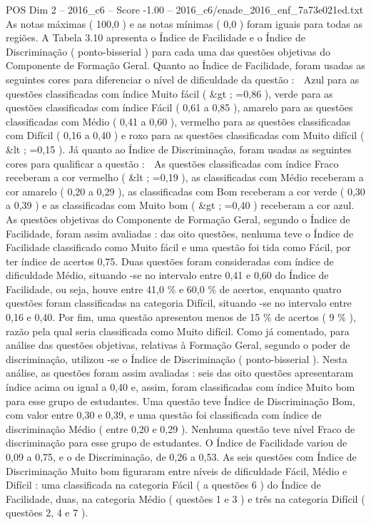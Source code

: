 \begin{textsample}{POS Dim 2 – 2016\_c6 – Score -1.00 – 2016\_c6/enade\_2016\_enf\_7a73e021ed.txt}
As notas máximas ( 100,0 ) e as notas mínimas ( 0,0 ) foram iguais para todas as regiões.
A Tabela 3.10 apresenta o Índice de Facilidade e o Índice de Discriminação ( ponto-bisserial ) para cada uma das questões objetivas do Componente de Formação Geral.
Quanto ao Índice de Facilidade, foram usadas as seguintes cores para diferenciar o nível de dificuldade da questão :  Azul para as questões classificadas com índice Muito fácil ( \&gt ; =0,86 ), verde para as questões classificadas com índice Fácil ( 0,61 a 0,85 ), amarelo para as questões classificadas com Médio ( 0,41 a 0,60 ), vermelho para as questões classificadas com Difícil ( 0,16 a 0,40 ) e roxo para as questões classificadas com Muito difícil ( \&lt ; =0,15 ).
Já quanto ao Índice de Discriminação, foram usadas as seguintes cores para qualificar a questão :  As questões classificadas com índice Fraco receberam a cor vermelho ( \&lt ; =0,19 ), as classificadas com Médio receberam a cor amarelo ( 0,20 a 0,29 ), as classificadas com Bom receberam a cor verde ( 0,30 a 0,39 ) e as classificadas com Muito bom ( \&gt ; =0,40 ) receberam a cor azul.
As questões objetivas do Componente de Formação Geral, segundo o Índice de Facilidade, foram assim avaliadas : das oito questões, nenhuma teve o Índice de Facilidade classificado como Muito fácil e uma questão foi tida como Fácil, por ter índice de acertos 0,75.
Duas questões foram consideradas com índice de dificuldade Médio, situando -se no intervalo entre 0,41 e 0,60 do Índice de Facilidade, ou seja, houve entre 41,0 \% e 60,0 \% de acertos, enquanto quatro questões foram classificadas na categoria Difícil, situando -se no intervalo entre 0,16 e 0,40.
Por fim, uma questão apresentou menos de 15 \% de acertos ( 9 \% ), razão pela qual seria classificada como Muito difícil.
Como já comentado, para análise das questões objetivas, relativas à Formação Geral, segundo o poder de discriminação, utilizou -se o Índice de Discriminação ( ponto-bisserial ).
Nesta análise, as questões foram assim avaliadas : seis das oito questões apresentaram índice acima ou igual a 0,40 e, assim, foram classificadas com índice Muito bom para esse grupo de estudantes.
Uma questão teve Índice de Discriminação Bom, com valor entre 0,30 e 0,39, e uma questão foi classificada com índice de discriminação Médio ( entre 0,20 e 0,29 ).
Nenhuma questão teve nível Fraco de discriminação para esse grupo de estudantes.
O Índice de Facilidade variou de 0,09 a 0,75, e o de Discriminação, de 0,26 a 0,53.
As seis questões com Índice de Discriminação Muito bom figuraram entre níveis de dificuldade Fácil, Médio e Difícil : uma classificada na categoria Fácil ( a questões 6 ) do Índice de Facilidade, duas, na categoria Médio ( questões 1 e 3 ) e três na categoria Difícil ( questões 2, 4 e 7 ).

\end{textsample}
